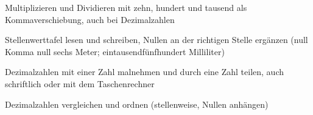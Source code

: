 \setcounter{aufgabe}{0}

\begin{aufgabe}{Multiplizieren und Dividieren mit zehn, hundert und tausend als Kommaverschiebung, auch bei Dezimalzahlen}
\end{aufgabe}

\begin{aufgabe}{Stellenwerttafel lesen und schreiben, Nullen an der richtigen Stelle ergänzen (null Komma null sechs Meter; eintausendfünfhundert Milliliter)}
\end{aufgabe}

\begin{aufgabe}{Dezimalzahlen mit einer Zahl malnehmen und durch eine Zahl teilen, auch schriftlich oder mit dem Taschenrechner}
\end{aufgabe}

\begin{aufgabe}{Dezimalzahlen vergleichen und ordnen (stellenweise, Nullen anhängen)}
\end{aufgabe}

